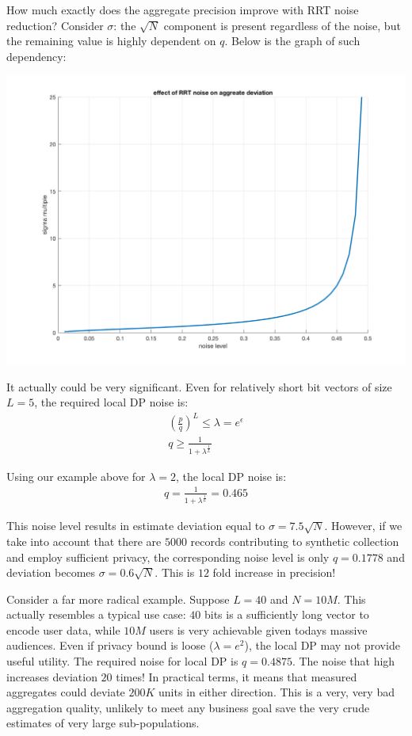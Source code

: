 \documentclass[11pt]{article}
\begin{document}
How much exactly does the aggregate precision improve with RRT noise reduction?
Consider $\sigma$: the $\sqrt{N}$ component is present regardless of the noise, but the remaining value is highly dependent on $q$.  Below is the  graph of such dependency:

 \includegraphics[scale =  0.25]{noise_effect.png}

It actually could be very significant.  Even for relatively short bit vectors of size $L=5$, the required local DP noise is:
 \begin{align}
\left ( \frac{p}{q} \right )^L \le \lambda = e^\epsilon \\
q \ge \frac{1}{1+ \lambda^{\frac{1}{L}}}
\end{align}

Using our example above for $\lambda = 2$, the local DP noise is:
 \begin{align}
q = \frac{1}{1+ \lambda^{\frac{1}{L}}}= 0.465
\end{align}

This noise level results in estimate deviation equal to $\sigma = 7.5 \sqrt{N} $.  However, if we take into account that there are $5000$  records contributing to synthetic collection and employ sufficient privacy, the corresponding noise level is only $q=0.1778$ and deviation becomes $\sigma = 0.6 \sqrt{N} $.  This is $12$ fold increase in precision! 

Consider a far more radical example.  Suppose $L=40$ and $N=10M$.   This actually resembles a typical use case: $40$ bits is a sufficiently long vector to encode user data, while $10M$ users is very achievable given todays massive audiences.  Even if privacy bound is loose ($\lambda=e^2$), the local DP may not provide useful utility.  The required noise for local DP is $q=0.4875$.  The noise that high increases deviation $20$ times!  In practical terms, it means that measured aggregates could deviate $200K$ units in either direction.  This is a very, very bad aggregation quality, unlikely to meet any business goal save the very crude estimates of very large sub-populations.
\end{document}
